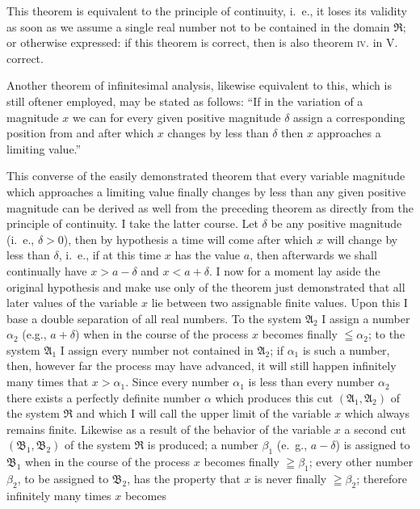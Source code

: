 \documentclass[polutonikogreek,english,twoside,openright]{article}
\begin{document}
This theorem is equivalent to the principle of continuity, i.~e., it
loses its validity as soon as we assume a single real number not to be
contained in the domain $\mathfrak{R}$; or otherwise expressed: if
this theorem is correct, then is also theorem \textsc{iv}. in
V. correct.

Another theorem of infinitesimal analysis, likewise equivalent to
this, which is still oftener employed, may be stated as follows: ``If
in the variation of a magnitude $x$ we can for every given positive
magnitude $\delta$ assign a corresponding position from and after
which $x$ changes by less than $\delta$ then $x$ approaches a limiting
value.''

This converse of the easily demonstrated theorem that every variable
magnitude which approaches a limiting value finally changes by less
than any given positive magnitude can be derived as well from the
preceding theorem as directly from the principle of continuity.  I
take the latter course.  Let $\delta$ be any positive magnitude
(i.~e., $\delta>0$), then by hypothesis a time will come after which
$x$ will change by less than $\delta$, i.~e., if at this time $x$ has
the value $a$, then afterwards we shall continually have $x>a-\delta$
and $x<a+\delta$.  I now for a moment lay aside the original
hypothesis and make use only of the theorem just demonstrated that all
later values of the variable $x$ lie between two assignable finite
values. Upon this I base a double separation of all real numbers.  To
the system $\mathfrak{A}_2$ I assign a number $\alpha_2$ (e.g.,
$a+\delta$) when in the course of the process $x$ becomes finally
$\leqq \alpha_2$; to the system $\mathfrak{A}_1$ I assign every number
not contained in $\mathfrak{A}_2$; if $\alpha_1$ is such a number,
then, however far the process may have advanced, it will still happen
infinitely many times that $x>\alpha_1$.  Since every number
$\alpha_1$ is less than every number $\alpha_2$ there exists a
perfectly definite number $\alpha$ which produces this cut
$(\mathfrak{A}_1, \mathfrak{A}_2)$ of the system $\mathfrak{R}$ and
which I will call the upper limit of the variable $x$ which always
remains finite.  Likewise as a result of the behavior of the variable
$x$ a second cut $(\mathfrak{B}_1, \mathfrak{B}_2)$ of the system
$\mathfrak{R}$ is produced; a number $\beta_1$ (e.~g., $a-\delta$) is
assigned to $\mathfrak{B}_1$ when in the course of the process $x$
becomes finally $\geqq\beta_1$; every other number $\beta_2$, to be
assigned to $\mathfrak{B}_2$, has the property that $x$ is never
finally $\geqq \beta_2$; therefore infinitely many times $x$ becomes
\end{document}
